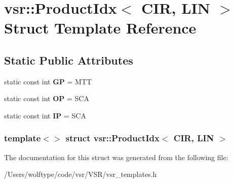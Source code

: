 \hypertarget{structvsr_1_1_product_idx_3_01_c_i_r_00_01_l_i_n_01_4}{\section{vsr\-:\-:Product\-Idx$<$ C\-I\-R, L\-I\-N $>$ Struct Template Reference}
\label{structvsr_1_1_product_idx_3_01_c_i_r_00_01_l_i_n_01_4}
}
\subsection*{Static Public Attributes}
\begin{DoxyCompactItemize}
\item 
\hypertarget{structvsr_1_1_product_idx_3_01_c_i_r_00_01_l_i_n_01_4_a8b2ef5beacc0bfcce50d657546e5632e}{static const int {\bfseries G\-P} = M\-T\-T}\label{structvsr_1_1_product_idx_3_01_c_i_r_00_01_l_i_n_01_4_a8b2ef5beacc0bfcce50d657546e5632e}

\item 
\hypertarget{structvsr_1_1_product_idx_3_01_c_i_r_00_01_l_i_n_01_4_a344df881addeed076a7c64f64d3cdd1e}{static const int {\bfseries O\-P} = S\-C\-A}\label{structvsr_1_1_product_idx_3_01_c_i_r_00_01_l_i_n_01_4_a344df881addeed076a7c64f64d3cdd1e}

\item 
\hypertarget{structvsr_1_1_product_idx_3_01_c_i_r_00_01_l_i_n_01_4_a9695c64e6dbf49185ab7144701f896bd}{static const int {\bfseries I\-P} = S\-C\-A}\label{structvsr_1_1_product_idx_3_01_c_i_r_00_01_l_i_n_01_4_a9695c64e6dbf49185ab7144701f896bd}

\end{DoxyCompactItemize}
\subsubsection*{template$<$$>$ struct vsr\-::\-Product\-Idx$<$ C\-I\-R, L\-I\-N $>$}



The documentation for this struct was generated from the following file\-:\begin{DoxyCompactItemize}
\item 
/\-Users/wolftype/code/vsr/\-V\-S\-R/vsr\-\_\-templates.\-h\end{DoxyCompactItemize}
